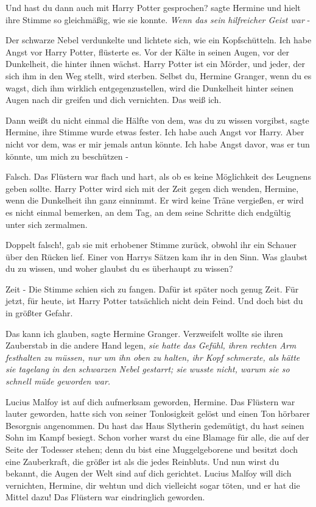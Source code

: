 \glqq Und hast du dann auch mit Harry Potter gesprochen?\grqq{} sagte Hermine
und hielt ihre Stimme so gleichmäßig, wie sie konnte. \emph{Wenn das sein
hilfreicher Geist war} -

Der schwarze Nebel verdunkelte und lichtete sich, wie ein Kopfschütteln. \glqq
Ich habe Angst vor Harry Potter\grqq{}, flüsterte es. \glqq Vor der Kälte in
seinen Augen, vor der Dunkelheit, die hinter ihnen wächst. Harry Potter ist ein
Mörder, und jeder, der sich ihm in den Weg stellt, wird sterben. Selbst du,
Hermine Granger, wenn du es wagst, dich ihm wirklich entgegenzustellen, wird die
Dunkelheit hinter seinen Augen nach dir greifen und dich vernichten. Das weiß
ich.\grqq{}

\glqq Dann weißt du nicht einmal die Hälfte von dem, was du zu wissen
vorgibst\grqq{}, sagte Hermine, ihre Stimme wurde etwas fester. \glqq Ich habe
auch Angst vor Harry. Aber nicht vor dem, was er mir jemals antun könnte. Ich
habe Angst davor, was er tun könnte, um mich zu beschützen -\grqq{}

\glqq Falsch.\grqq{} Das Flüstern war flach und hart, als ob es keine
Möglichkeit des Leugnens geben sollte. \glqq Harry Potter wird sich mit der Zeit
gegen dich wenden, Hermine, wenn die Dunkelheit ihn ganz einnimmt. Er wird keine
Träne vergießen, er wird es nicht einmal bemerken, an dem Tag, an dem seine
Schritte dich endgültig unter sich zermalmen.\grqq{}

\glqq Doppelt falsch!\grqq{}, gab sie mit erhobener Stimme zurück, obwohl ihr
ein Schauer über den Rücken lief. Einer von Harrys Sätzen kam ihr in den Sinn.
\glqq Was glaubst du zu wissen, und woher glaubst du es überhaupt zu
wissen?\grqq{}

\glqq Zeit -\grqq{} Die Stimme schien sich zu fangen. \glqq Dafür ist später
noch genug Zeit. Für jetzt, für heute, ist Harry Potter tatsächlich nicht dein
Feind. Und doch bist du in größter Gefahr.\grqq{}

\glqq Das kann ich glauben\grqq{}, sagte Hermine Granger. Verzweifelt wollte sie
ihren Zauberstab in die andere Hand legen,\emph{ sie hatte das Gefühl, ihren
rechten Arm festhalten zu müssen, nur um ihn oben zu halten, ihr Kopf schmerzte,
als hätte sie tagelang in den schwarzen Nebel gestarrt; sie wusste nicht, warum
sie so schnell müde geworden war.}

\glqq Lucius Malfoy ist auf dich aufmerksam geworden, Hermine.\grqq{} Das
Flüstern war lauter geworden, hatte sich von seiner Tonlosigkeit gelöst und
einen Ton hörbarer Besorgnis angenommen. \glqq Du hast das Haus Slytherin
gedemütigt, du hast seinen Sohn im Kampf besiegt. Schon vorher warst du eine
Blamage für alle, die auf der Seite der Todesser stehen; denn du bist eine
Muggelgeborene und besitzt doch eine Zauberkraft, die größer ist als die jedes
Reinbluts. Und nun wirst du bekannt, die Augen der Welt sind auf dich gerichtet.
Lucius Malfoy will dich vernichten, Hermine, dir wehtun und dich vielleicht
sogar töten, und er hat die Mittel dazu!\grqq{} Das Flüstern war eindringlich
geworden.

